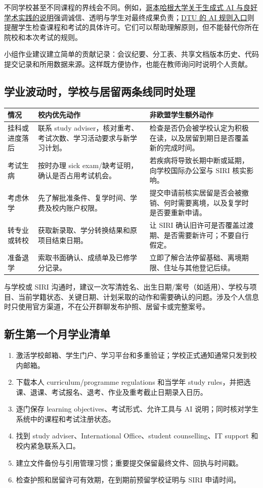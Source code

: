 不同学校甚至不同课程的界线会不同。例如，\href{https://fbu.ku.dk/english/generative-ai/}{哥本哈根大学关于生成式 AI 与良好学术实践的说明}强调诚信、透明与学生对最终成果负责；\href{https://www.ai.dtu.dk/rules/}{DTU 的 AI 规则入口}则提醒学生检查课程和考试的具体许可。它们可以帮助理解原则，但不能替代你所在院校和本次考试的规则。

小组作业建议建立简单的贡献记录：会议纪要、分工表、共享文档版本历史、代码提交记录和所用数据来源。这样既方便协作，也能在教师询问时说明个人贡献。

\subsection{学业波动时，学校与居留两条线同时处理}

\noindent\begin{tabularx}{\textwidth}{@{}p{}X X@{}}
\toprule
情况 & 校内优先动作 & 非欧盟学生额外动作 \\
\midrule
挂科或进度落后 & 联系 study adviser，核对重考、考试次数、学习活动要求与新学习计划。 & 检查是否仍会被学校认定为积极在读，以及居留到期日是否覆盖新的完成时间。 \\
考试生病 & 按时办理 sick exam/缺考证明，确认是否占用考试机会。 & 若疾病将导致长期中断或延期，向学校国际办公室与 SIRI 核实影响。 \\
考虑休学 & 先了解批准条件、复学时间、学费及校内账户权限。 & 提交申请前核实居留是否会被撤销、何时需要离境，以及复学时是否要重新申请。 \\
转专业或转校 & 获取新录取、学分转换结果和原项目结束日期。 & 让 SIRI 确认旧许可是否覆盖过渡期、是否需要新许可；不要自行假定。 \\
准备退学 & 索取书面确认、成绩单及已修学分记录。 & 立即了解合法停留基础、离境期限、住址与其他登记后续。 \\
\bottomrule
\end{tabularx}

与学校或 SIRI 沟通时，建议一次写清姓名、出生日期/案号（如适用）、学校与项目、当前学籍状态、关键日期、计划采取的动作和需要确认的问题。涉及个人信息时只使用官方渠道，不在公开群聊发布护照、居留卡或完整案号。

\subsection{新生第一个月学业清单}

\begin{enumerate}
  \item 激活学校邮箱、学生门户、学习平台和多重验证；学校正式通知通常只发到校内邮箱。
  \item 下载本人 curriculum/programme regulations 和当学年 study rules，并把选课、退课、考试报名、退考、作业及重考截止日期录入日历。
  \item 逐门保存 learning objectives、考试形式、允许工具与 AI 说明；同时核对学生系统中的课程和考试注册状态。
  \item 找到 study adviser、International Office、student counselling、IT support 和校内紧急联系入口。
  \item 建立文件备份与引用管理习惯；重要提交保留最终文件、回执与时间戳。
  \item 检查护照和居留许可有效期，在到期前预留学校证明与 SIRI 申请时间。
\end{enumerate}
